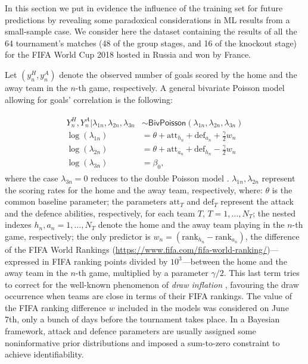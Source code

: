 \documentclass{statsoc}
\begin{document}
\color{black}

In this section we put in evidence the influence of the training set for future predictions by revealing some paradoxical considerations  in ML results from  a small-sample case. We consider here the dataset containing the results of all the 64 tournament's matches (48 of the group stages, and 16 of the knockout stage) for the FIFA World Cup 2018 hosted in Russia and won by France.

Let $(y^{H}_{n}, y^{A}_{n})$ denote the observed number of goals scored by the home and the away team in the $n$-th game, respectively. A general bivariate Poisson model allowing for goals' correlation \citep{karlis2003analysis} is the following:

\begin{eqnarray}
\begin{split}
Y^H_n, Y^A_n| \lambda_{1n}, \lambda_{2n}, \lambda_{3n} & \sim \mathsf{BivPoisson}(\lambda_{1n}, \lambda_{2n}, \lambda_{3n})\\ 
\log(\lambda_{1n}) & = \theta+\text{att}_{h_n}+\text{def}_{a_n}+\frac{\gamma}{2} w_n\\
\log(\lambda_{2n}) & = \theta+\text{att}_{a_n}+\text{def}_{h_n}-\frac{\gamma}{2} w_n\\
\log(\lambda_{3n}) & =\beta_0,
\end{split}
\label{eq:bivariate}
\end{eqnarray}
where the case $\lambda_{3n}=0$ reduces to the double Poisson model \citep{baio2010bayesian}.  $\lambda_{1n}, \lambda_{2n}$ represent the scoring rates for the home and the away team, respectively, where: $\theta$ is the common baseline parameter; the parameters $\text{att}_T$ and $\text{def}_T$ represent the attack and the defence abilities, 
respectively, for each team $T$, $T=1,\ldots,N_T$; the nested indexes $h_{n}, a_{n}=1,\ldots,N_T$ denote the home and the away team playing in the $n$-th game, 
respectively; the only predictor is $w_n= (\text{rank}_{h_n}- \text{rank}_{a_n} )$, the difference of the FIFA World Rankings (\url{https://www.fifa.com/fifa-world-ranking/})---expressed in FIFA ranking points divided by $10^3$---between the home and the away team in 
the $n$-th game, multiplied by a parameter ${\gamma}/{2}$.  This last term tries to correct for the well-known phenomenon of \emph{draw inflation} \citep{karlis2003analysis}, 
favouring the draw occurrence when teams are close in terms of their FIFA rankings. The value of the 
FIFA ranking difference $w$ included in the models was considered on June 7th, only a bunch 
of days before the tournament takes place.  In a Bayesian framework, attack and defence parameters are usually assigned some noninformative prior distributions \citep{baio2010bayesian} and imposed a sum-to-zero constraint to achieve identifiability.
\end{document}
